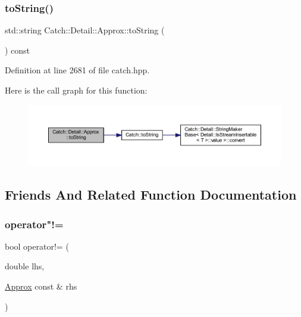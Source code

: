 \subsubsection{\texorpdfstring{to\+String()}{toString()}}
{\footnotesize\ttfamily std\+::string Catch\+::\+Detail\+::\+Approx\+::to\+String (\begin{DoxyParamCaption}{ }\end{DoxyParamCaption}) const\hspace{0.3cm}{\ttfamily [inline]}}



Definition at line 2681 of file catch.\+hpp.

Here is the call graph for this function\+:\nopagebreak
\begin{figure}[H]
\begin{center}
\leavevmode
\includegraphics[width=350pt]{class_catch_1_1_detail_1_1_approx_a972fd9ac60607483263f1b0f0f9955e6_cgraph}
\end{center}
\end{figure}


\subsection{Friends And Related Function Documentation}
\hypertarget{class_catch_1_1_detail_1_1_approx_a83b3763569a7ecc143c335b630be0e47}{}\label{class_catch_1_1_detail_1_1_approx_a83b3763569a7ecc143c335b630be0e47} 
\subsubsection{\texorpdfstring{operator"!=}{operator!=}\hspace{0.1cm}{\footnotesize\ttfamily [1/2]}}
{\footnotesize\ttfamily bool operator!= (\begin{DoxyParamCaption}\item[{double}]{lhs,  }\item[{\hyperlink{class_catch_1_1_detail_1_1_approx}{Approx} const \&}]{rhs }\end{DoxyParamCaption})\hspace{0.3cm}{\ttfamily [friend]}}



